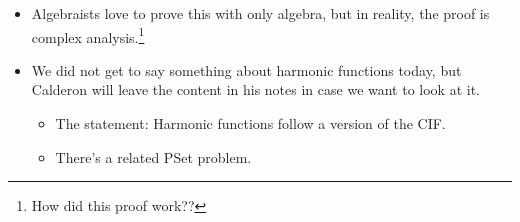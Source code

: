\documentclass[../notes.tex]{subfiles}
\begin{document}
\begin{itemize}
\begin{proof}
        Suppose inductively that $d\geq 1$.\par
        Step 1 (show that there exists one root): Suppose for the sake of contradiction that $p$ has no zeros. Since $p$ is a polynomial, we know that $|p(z)|\to\infty$ as $|z|\to\infty$. Thus, there exists $R>0$ such that for all $z$ with $|z|>R$, $|p(z)|\geq|p(0)|$. Then $|p(z)|$ must take a minimum on $\overline{D_R}$. But to keep $p$ from being constant by the minimum modulus principle, the minimum has to be on $\partial D_R$. Now take a slightly bigger disk; our global minimum is now in the interior, so $p$ is constant, a contradiction. It follows that $p$ must have a zero in $D_R$.\par
        Step 2: Suppose $p$ has a root at $z_0$. Then power series for $p$ at $z_0$ is $p(z)=(z-z_0)p_1(z)$. $p_1$ is a polynomial of degree $d-1$.\par
        Step 3: Now iterate to find that $p$ is a product of monomials.
    \end{proof}
    \item Algebraists love to prove this with only algebra, but in reality, the proof is complex analysis.\footnote{How did this proof work??}
    \item We did not get to say something about harmonic functions today, but Calderon will leave the content in his notes in case we want to look at it.
    \begin{itemize}
        \item The statement: Harmonic functions follow a version of the CIF.
        \item There's a related PSet problem.
    \end{itemize}
\end{itemize}
\end{document}
